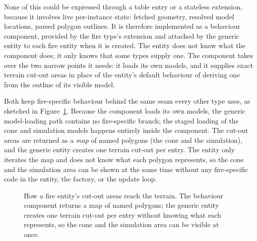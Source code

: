 None of this could be expressed through a table entry or a stateless extension, because it involves live per-instance state: fetched geometry, resolved model locations, parsed polygon outlines. It is therefore implemented as a behaviour component, provided by the fire type's extension and attached by the generic entity to each fire entity when it is created. The entity does not know what the component does; it only knows that some types supply one. The component takes over the two narrow points it needs: it loads its own models, and it supplies exact terrain cut-out areas in place of the entity's default behaviour of deriving one from the outline of its visible model.

Both keep fire-specific behaviour behind the same seam every other type uses, as sketched in Figure~\ref{fig:fire-fix}. Because the component loads its own models, the generic model-loading path contains no fire-specific branch; the staged loading of the cone and simulation models happens entirely inside the component. The cut-out areas are returned as a \emph{map} of named polygons (the cone and the simulation), and the generic entity creates one terrain cut-out per entry. The entity only iterates the map and does not know what each polygon represents, so the cone and the simulation area can be shown at the same time without any fire-specific code in the entity, the factory, or the update loop.

\begin{figure}[t]
  \centering
  \caption[Named cut-out areas for fire entities]{How a fire entity's cut-out areas reach the terrain. The behaviour component returns a map of named polygons; the generic entity creates one terrain cut-out per entry without knowing what each represents, so the cone and the simulation area can be visible at once.}
  \label{fig:fire-fix}
\end{figure}

